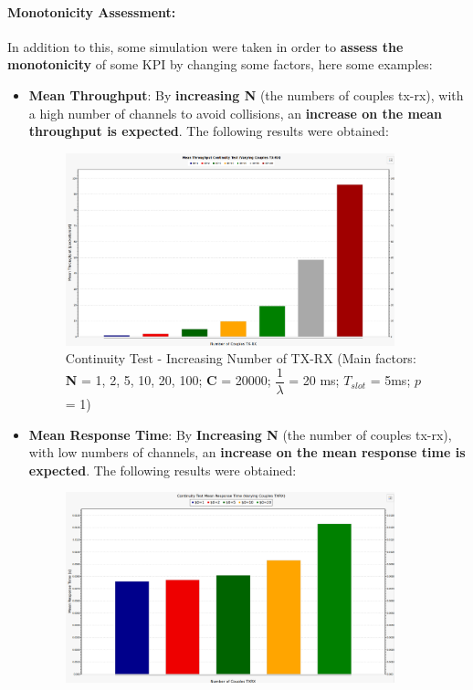 \paragraph{Monotonicity Assessment:}
\noindent In addition to this, some simulation were taken in order to \textbf{assess the monotonicity} of some KPI by changing some factors, here some examples:
\begin{itemize}
	\item \textbf{Mean Throughput}: By \textbf{increasing N} (the numbers of couples tx-rx), with a high number of channels to avoid collisions, an \textbf{increase on the mean throughput is expected}. The following results were obtained:
	\begin{figure}[H]
		\centering
		\includegraphics[width=0.9\textwidth]{img/continuityTest_Throughput_TXRX_Varying.png}
		\caption{Continuity Test - Increasing Number of TX-RX (Main factors: \textbf{N} = 1, 2, 5, 10, 20, 100; \textbf{C} = 20000; $\dfrac{1}{\lambda}$ = 20 ms; $T_{slot}$ = 5ms; $p$ = 1)}
		\label {img: continuityTestThTXRX}
	\end{figure}
	\item \textbf{Mean Response Time}: By \textbf{Increasing N} (the number of couples tx-rx), with low numbers of channels, an \textbf{increase on the mean response time is expected}. The following results were obtained:
	\begin{figure}[H]
		\centering
		\includegraphics[width=0.9\textwidth]{img/ContinuityTest_ResponseTIme_TXRXVarying}

\end{figure}
\end{itemize}
